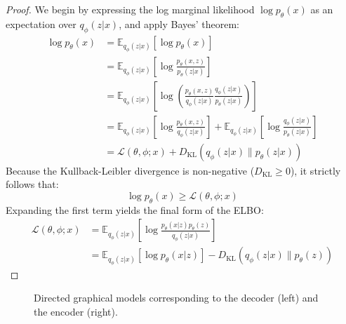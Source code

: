 \begin{proof}
We begin by expressing the log marginal likelihood $\log p_\theta(x)$ as an expectation over $q_\phi(z|x)$, and apply Bayes' theorem:
\begin{align}
    \log p_\theta(x) &= \mathbb{E}_{q_\phi(z|x)}[\log p_\theta(x)] \\
    &= \mathbb{E}_{q_\phi(z|x)}\left[\log \frac{p_\theta(x, z)}{p_\theta(z|x)}\right] \\
    &= \mathbb{E}_{q_\phi(z|x)}\left[\log \left( \frac{p_\theta(x, z)}{q_\phi(z|x)} \frac{q_\phi(z|x)}{p_\theta(z|x)} \right)\right] \\
    &= \mathbb{E}_{q_\phi(z|x)}\left[\log \frac{p_\theta(x, z)}{q_\phi(z|x)}\right] + \mathbb{E}_{q_\phi(z|x)}\left[\log \frac{q_\phi(z|x)}{p_\theta(z|x)}\right] \\
    &= \mathcal{L}(\theta, \phi; x) + D_{\text{KL}}(q_\phi(z|x) \parallel p_\theta(z|x))
\end{align}
Because the Kullback-Leibler divergence is non-negative ($D_{\text{KL}} \ge 0$), it strictly follows that:
\begin{equation}
    \log p_\theta(x) \ge \mathcal{L}(\theta, \phi; x)
\end{equation}
Expanding the first term yields the final form of the ELBO:
\begin{align}
    \mathcal{L}(\theta, \phi; x) &= \mathbb{E}_{q_\phi(z|x)}\left[\log \frac{p_\theta(x|z) p_\theta(z)}{q_\phi(z|x)}\right] \\
    &= \mathbb{E}_{q_\phi(z|x)}[\log p_\theta(x|z)] - D_{\text{KL}}(q_\phi(z|x) \parallel p_\theta(z))
\end{align}
\end{proof}

\begin{figure}[htbp]
    \centering
    \caption{Directed graphical models corresponding to the decoder (left) and the encoder (right).}
    \label{fig:graphical_model}
\end{figure}

